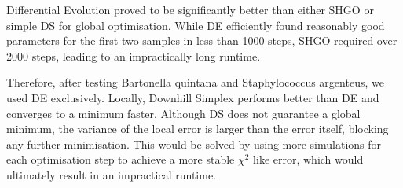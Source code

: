 Differential Evolution proved to be significantly better than either \ac{SHGO} or
simple \ac{DS} for global optimisation. While \ac{DE} efficiently found reasonably good parameters for the first two samples in less than 1000 steps, \ac{SHGO} required over 2000 steps, leading to an impractically long runtime.

Therefore, after testing Bartonella quintana and Staphylococcus argenteus, we used \ac{DE} exclusively.
Locally, Downhill Simplex performs better than \ac{DE} and converges to a minimum faster.
Although \ac{DS} does not guarantee a global minimum, the variance of the local error is larger than the error itself, blocking any further minimisation.
This would be solved by using more simulations for each optimisation step to achieve a more stable $\chi^2$ like error, which would ultimately result in an impractical runtime.
